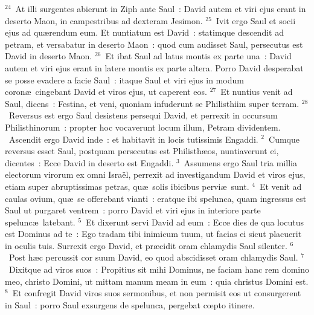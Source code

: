 ${}^{24}$~At illi surgentes abierunt in Ziph ante Saul~: David autem et viri ejus erant in deserto Maon, in campestribus ad dexteram Jesimon.
${}^{25}$~Ivit ergo Saul et socii ejus ad qu\ae rendum eum. Et nuntiatum est David~: statimque descendit ad petram, et versabatur in deserto Maon~: quod cum audisset Saul, persecutus est David in deserto Maon.
${}^{26}$~Et ibat Saul ad latus montis ex parte una~: David autem et viri ejus erant in latere montis ex parte altera. Porro David desperabat se posse evadere a facie Saul~: itaque Saul et viri ejus in modum coron\ae\ cingebant David et viros ejus, ut caperent eos.
${}^{27}$~Et nuntius venit ad Saul, dicens~: Festina, et veni, quoniam infuderunt se Philisthiim super terram.
${}^{28}$~Reversus est ergo Saul desistens persequi David, et perrexit in occursum Philisthinorum~: propter hoc vocaverunt locum illum, Petram dividentem.
~Ascendit ergo David inde~: et habitavit in locis tutissimis Engaddi.
${}^{2}$~Cumque reversus esset Saul, postquam persecutus est Philisth\ae os, nuntiaverunt ei, dicentes~: Ecce David in deserto est Engaddi.
${}^{3}$~Assumens ergo Saul tria millia electorum virorum ex omni Isra\"el, perrexit ad investigandum David et viros ejus, etiam super abruptissimas petras, qu\ae\ solis ibicibus pervi\ae\ sunt.
${}^{4}$~Et venit ad caulas ovium, qu\ae\ se offerebant vianti~: eratque ibi spelunca, quam ingressus est Saul ut purgaret ventrem~: porro David et viri ejus in interiore parte spelunc\ae\ latebant.
${}^{5}$~Et dixerunt servi David ad eum~: Ecce dies de qua locutus est Dominus ad te~: Ego tradam tibi inimicum tuum, ut facias ei sicut placuerit in oculis tuis. Surrexit ergo David, et pr\ae cidit oram chlamydis Saul silenter.
${}^{6}$~Post h\ae c percussit cor suum David, eo quod abscidisset oram chlamydis Saul.
${}^{7}$~Dixitque ad viros suos~: Propitius sit mihi Dominus, ne faciam hanc rem domino meo, christo Domini, ut mittam manum meam in eum~: quia christus Domini est.
${}^{8}$~Et confregit David viros suos sermonibus, et non permisit eos ut consurgerent in Saul~: porro Saul exsurgens de spelunca, pergebat cœpto itinere.


